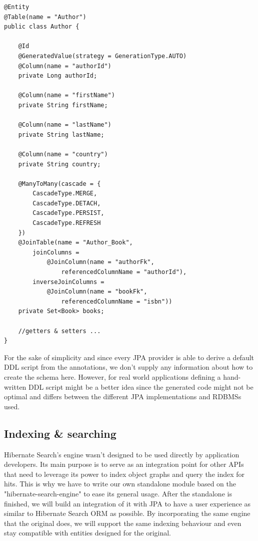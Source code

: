 \pagebreak

\lstset{language=java}
\begin{lstlisting}[frame=htrbl, caption={Author.java}, label={lst:author.java_1}]
@Entity
@Table(name = "Author")
public class Author {
	
	@Id
	@GeneratedValue(strategy = GenerationType.AUTO)
	@Column(name = "authorId")
	private Long authorId;
	
	@Column(name = "firstName")
	private String firstName;
	
	@Column(name = "lastName")
	private String lastName;
	
	@Column(name = "country")
	private String country;
	
	@ManyToMany(cascade = {
		CascadeType.MERGE, 
		CascadeType.DETACH, 
		CascadeType.PERSIST, 
		CascadeType.REFRESH
	})
	@JoinTable(name = "Author_Book", 
		joinColumns = 
			@JoinColumn(name = "authorFk", 
				referencedColumnName = "authorId"),
		inverseJoinColumns = 
			@JoinColumn(name = "bookFk", 
				referencedColumnName = "isbn"))
	private Set<Book> books;
	
	//getters & setters ...
}
\end{lstlisting}
For the sake of simplicity and since every JPA provider is able to derive a default DDL script from the annotations, we don't supply any information about how to create the schema here. However, for real world applications defining a hand-written DDL script might be a better idea since the generated code might not be optimal and differs between the different JPA implementations and RDBMSs used.

\pagebreak

\subsection{Indexing \& searching} \label{problem_indexing_searching}
Hibernate Search's engine wasn't designed to be used directly by application developers. Its main purpose is to serve as an integration point for other APIs that need to leverage its power to index object graphs and query the index for hits. This is why we have to write our own standalone module based on the "hibernate-search-engine" to ease its general usage. After the standalone is finished, we will build an integration of it with JPA to have a user experience as similar to Hibernate Search ORM as possible. By incorporating the same engine that the original does, we will support the same indexing behaviour and even stay compatible with entities designed for the original.

